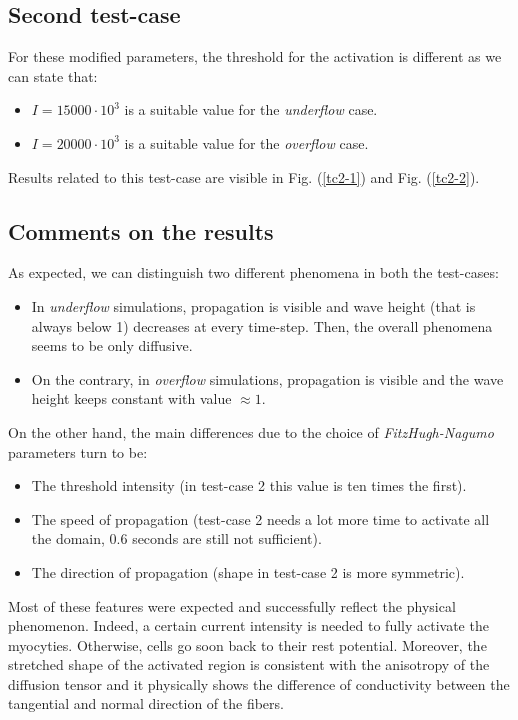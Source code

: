 \documentclass[a4paper,11pt]{article}
\begin{document}
\subsection{Second test-case}
For these modified parameters, the threshold for the activation is different as we can state that:
\begin{itemize}
	\item $I = 15000 \cdot 10^3 $ is a suitable value for the \emph{underflow} case.
	\item $I = 20000 \cdot 10^3 $ is a suitable value for the \emph{overflow} case.
\end{itemize}

\noindent Results related to this test-case are visible in Fig. (\ref{tc2-1}) and Fig. (\ref{tc2-2}).

\subsection{Comments on the results}
As expected, we can distinguish two different phenomena in both the test-cases:
\begin{itemize}
	\item In \emph{underflow} simulations, propagation is visible and wave height (that is always below 1) decreases at every time-step. Then, the overall phenomena seems to be only diffusive.
	\item On the contrary, in \emph{overflow} simulations, propagation is visible and the wave height keeps constant with value $\approx 1$.  
\end{itemize}

\noindent On the other hand, the main differences due to the choice of \emph{FitzHugh-Nagumo} parameters turn to be:
\begin{itemize}
	\item The threshold intensity (in test-case 2 this value is ten times the first).
	\item The speed of propagation (test-case 2 needs a lot more time to activate all the domain, 0.6 seconds are still not sufficient).
	\item The direction of propagation (shape in test-case 2 is more symmetric).
\end{itemize}
 
\noindent Most of these features were expected and successfully reflect the physical phenomenon. Indeed, a certain current intensity is needed to fully activate the myocyties. Otherwise, cells go soon back to their rest potential. Moreover, the stretched shape of the activated region is consistent with the anisotropy of the diffusion tensor and it physically shows the difference of conductivity between the tangential and normal direction of the fibers.\\
\end{document}
